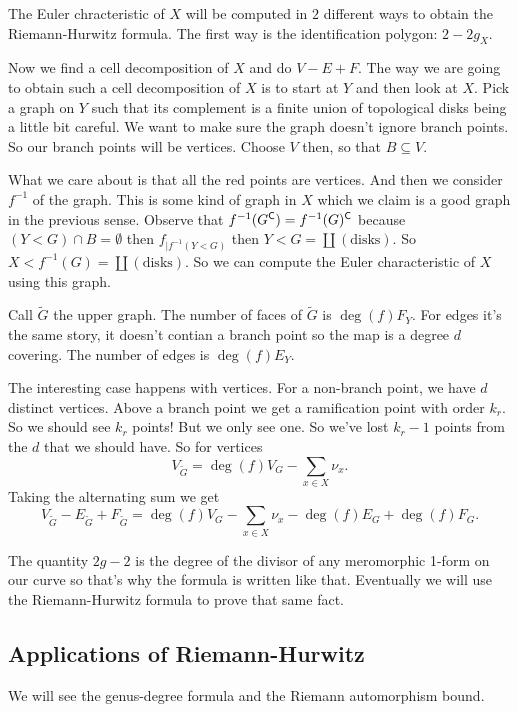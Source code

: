 \documentclass[12pt]{memoir}
\begin{document}
\begin{ptcbp}
    The Euler chracteristic of $X$ will be computed in $2$ different ways to obtain the Riemann-Hurwitz formula. The first way is the identification polygon: $2-2g_X$.\par
    Now we find a cell decomposition of $X$ and do $V-E+F$. The way we are going to obtain such a cell decomposition of $X$ is to start at $Y$ and then look at $X$. Pick a graph on $Y$ such that its complement is a finite union of topological disks being a little bit careful. We want to make sure the graph doesn't ignore branch points. So our branch points will be vertices. Choose $V$ then, so that $B\subseteq V$.\par
    What we care about is that all the red points are vertices. And then we consider $f^{-1}$ of the graph. This is some kind of graph in $X$ which we claim is a good graph in the previous sense. Observe that $f^{-1}(G^{\mathsf{C}})=f^{-1}(G)^{\mathsf{C}}$ because $(Y\less G)\cap B=\emptyset$ then $f_{\mid f^{-1}(Y\less G)}$ then $Y\less G=\coprod (\text{disks})$. So $X\less f^{-1}(G)=\coprod (\text{disks})$. So we can compute the Euler characteristic of $X$ using this graph.\par
    Call $\tilde{G}$ the upper graph. The number of faces of $\tilde{G}$ is $\deg(f)F_Y$. For edges it's the same story, it doesn't contian a branch point so the map is a degree $d$ covering. The number of edges is $\deg(f)E_Y$.\par
    The interesting case happens with vertices. For a non-branch point, we have $d$ distinct vertices. Above a branch point we get a ramification point with order $k_r$. So we should see $k_r$ points! But we only see one. So we've lost $k_r-1$ points from the $d$ that we should have. So for vertices 
    $$V_{\tilde{G}}=\deg(f)V_G-\sum_{x\in X}\nu_x.$$
    Taking the alternating sum we get 
    $$V_{\tilde{G}}-E_{\tilde{G}}+F_{\tilde{G}}=\deg(f)V_G-\sum_{x\in X}\nu_x-\deg(f)E_G+\deg(f)F_G.$$ 
\end{ptcbp}

The quantity $2g-2$ is the degree of the divisor of any meromorphic 1-form on our curve so that's why the formula is written like that. Eventually we will use the Riemann-Hurwitz formula to prove that same fact. 

\subsection{Applications of Riemann-Hurwitz}

We will see the genus-degree formula and the Riemann automorphism bound.
\end{document}
